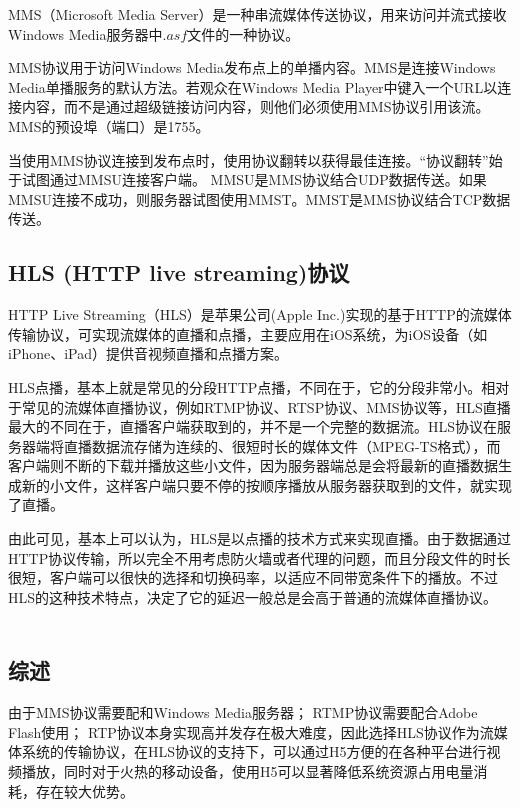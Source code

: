 \documentclass[bachelor]{thesis-uestc}
\begin{document}
\par MMS（Microsoft Media Server）是一种串流媒体传送协议，用来访问并流式接收Windows Media服务器中$.asf$文件的一种协议。

\par MMS协议用于访问Windows Media发布点上的单播内容。MMS是连接Windows Media单播服务的默认方法。若观众在Windows Media Player中键入一个URL以连接内容，而不是通过超级链接访问内容，则他们必须使用MMS协议引用该流。MMS的预设埠（端口）是1755。
\par 当使用MMS协议连接到发布点时，使用协议翻转以获得最佳连接。“协议翻转”始于试图通过MMSU连接客户端。 MMSU是MMS协议结合UDP数据传送。如果MMSU连接不成功，则服务器试图使用MMST。MMST是MMS协议结合TCP数据传送。

\subsection{HLS (HTTP live streaming)协议}
\par HTTP Live Streaming（HLS）是苹果公司(Apple Inc.)实现的基于HTTP的流媒体传输协议，可实现流媒体的直播和点播，主要应用在iOS系统，为iOS设备（如iPhone、iPad）提供音视频直播和点播方案。

\par HLS点播，基本上就是常见的分段HTTP点播，不同在于，它的分段非常小。相对于常见的流媒体直播协议，例如RTMP协议、RTSP协议、MMS协议等，HLS直播最大的不同在于，直播客户端获取到的，并不是一个完整的数据流。HLS协议在服务器端将直播数据流存储为连续的、很短时长的媒体文件（MPEG-TS格式），而客户端则不断的下载并播放这些小文件，因为服务器端总是会将最新的直播数据生成新的小文件，这样客户端只要不停的按顺序播放从服务器获取到的文件，就实现了直播。

\par 由此可见，基本上可以认为，HLS是以点播的技术方式来实现直播。由于数据通过HTTP协议传输，所以完全不用考虑防火墙或者代理的问题，而且分段文件的时长很短，客户端可以很快的选择和切换码率，以适应不同带宽条件下的播放。不过HLS的这种技术特点，决定了它的延迟一般总是会高于普通的流媒体直播协议。 
　

\subsection{综述}

\par 由于MMS协议需要配和Windows Media服务器； RTMP协议需要配合Adobe Flash使用； RTP协议本身实现高并发存在极大难度，因此选择HLS协议作为流媒体系统的传输协议，在HLS协议的支持下，可以通过H5方便的在各种平台进行视频播放，同时对于火热的移动设备，使用H5可以显著降低系统资源占用电量消耗，存在较大优势。
\end{document}
